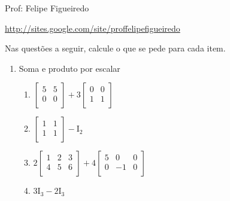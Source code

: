 \documentclass[a4paper]{article}
\begin{document}
\parbox[c]{.825\textwidth}{\raggedright%
{Prof: Felipe Figueiredo\par}
{\url{http://sites.google.com/site/proffelipefigueiredo}}

\vspace{1cm}
}

Nas questões a seguir, calcule o que se pede para cada item.

\begin{multicols}{2}

\begin{enumerate}
\item Soma e produto por escalar

\begin{enumerate}
\item
$  \begin{bmatrix}
    5 & 5\\
    0 & 0 \\
  \end{bmatrix} +
  3 \begin{bmatrix}
    0 & 0\\
    1 & 1\\
  \end{bmatrix}
$

\item 
$
\begin{bmatrix}
  1 & 1\\
  1 & 1\\
\end{bmatrix}
- \mathrm{I}_2
$

\item 
$
2 \begin{bmatrix}
  1 & 2 & 3\\
  4 & 5 & 6\\
\end{bmatrix}
+
4 \begin{bmatrix}
 5 & 0 & 0\\
 0 & -1 & 0\\
\end{bmatrix}
$

\item 
$
3 \mathrm{I}_3 - 2 \mathrm{I}_3
$


\end{enumerate}
\end{enumerate}
\end{multicols}
\end{document}
